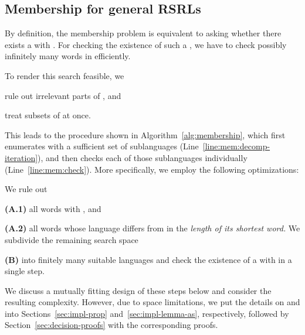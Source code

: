 \documentclass[envcountsame]{llncs}
\newcommand{\RegularlyGeneratedLanguageSetsAbbrev}{RSRLs\xspace}
\begin{document}
\subsection{Membership for general \RegularlyGeneratedLanguageSetsAbbrev}
\label{sec:memb-gener-case}

\begin{algorithm}[tbp]

  \ForEach{}{ \label{line:mem:decomp-iteration}
    \lIf{}{\label{line:mem:check}
      \Return \;}}
  \Return \;
  \caption{}
  \label{alg:membership}
\end{algorithm}


By definition, the membership problem is equivalent to asking whether
there exists a  with .
For checking the existence of such a , we have to check possibly
infinitely many words in  efficiently.
\begin{inparaenum}[\bfseries (A)]
  To render this search feasible, we
\item rule out irrelevant parts of , and
\item treat subsets of  at once.
\end{inparaenum}
This leads to the procedure  shown in
Algorithm~\ref{alg:membership}, which first enumerates with  a sufficient set of sublanguages
(Line~\ref{line:mem:decomp-iteration}), and then checks each of those
sublanguages individually (Line~\ref{line:mem:check}).
More specifically, we employ the following optimizations:
\begin{inparaenum}
  We rule out
\item[\bfseries (A.1)] all words  with ,
  and
\item[\bfseries (A.2)] all words  whose language 
  differs from  in the \emph{length of its shortest
    word.} 
We subdivide the remaining search space 
\item[\bfseries (B)] into finitely many suitable languages  and
  check the existence of a  with  in a single
  step.
\end{inparaenum}


We discuss a mutually fitting design of these steps below and
consider the resulting complexity. 
However, due to space limitations, we put the details on
 and  into
Sections~\ref{sec:impl-prop} and~\ref{sec:impl-lemma-as},
respectively, followed by Section~\ref{sec:decision-proofs} with the
corresponding proofs. 
\end{document}
